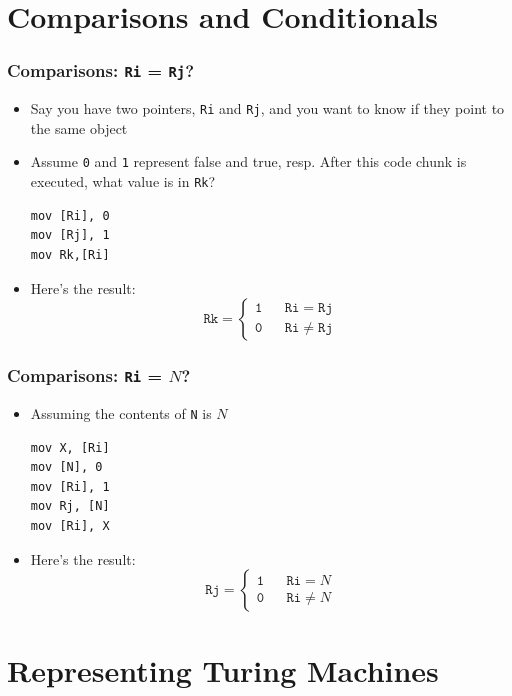 \documentclass{beamer}
\begin{document}
\section{Comparisons and Conditionals}

\begin{frame}[fragile]
\frametitle{Comparisons: \Verb+Ri+ = \Verb+Rj+?}

\begin{itemize}
\item Say you have two pointers, \Verb+Ri+ and \Verb+Rj+, and you want to know if they point to the same object
\pause

\item Assume \Verb+0+ and \Verb+1+ represent false and true, resp. After this code chunk is executed, what value is in \Verb+Rk+?
\begin{Verbatim}
mov [Ri], 0
mov [Rj], 1
mov Rk,[Ri]
\end{Verbatim}
\pause
\item Here's the result:
\[
\mathtt{Rk} = 
\left\{\begin{array}{lcl}
\mathtt{1} && \mathtt{Ri} = \mathtt{Rj}
\\
\mathtt{0} && \mathtt{Ri} \neq \mathtt{Rj}
\end{array}\right.
\]
\end{itemize}
\end{frame}

\begin{frame}[fragile]
\frametitle{Comparisons: \Verb+Ri+ = $N$?}

\begin{itemize}
\item Assuming the contents of \Verb+N+ is $N$
\begin{Verbatim}
mov X, [Ri]
mov [N], 0
mov [Ri], 1
mov Rj, [N]
mov [Ri], X
\end{Verbatim}

\pause
\item Here's the result:
\[
\mathtt{Rj} = 
\left\{\begin{array}{lcl}
\mathtt{1} && \mathtt{Ri} = N
\\
\mathtt{0} && \mathtt{Ri} \neq N
\end{array}\right.
\]
\end{itemize}

\end{frame}

\section{Representing Turing Machines}
\end{document}
